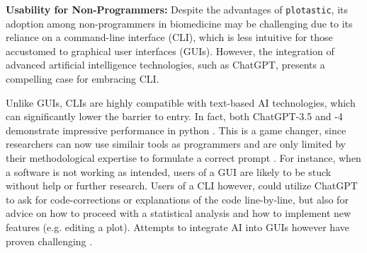 



\textbf{Usability for Non-Programmers:}
Despite the advantages of \texttt{plotastic}, its adoption among non-programmers
in biomedicine may be challenging due to its reliance on a command-line
interface (CLI), which is less intuitive for those accustomed to graphical user
interfaces (GUIs). However, the integration of advanced artificial intelligence
technologies, such as ChatGPT, presents a compelling case for embracing CLI.

Unlike GUIs, CLIs are highly compatible with text-based AI technologies, which
can significantly lower the barrier to entry. In fact, both ChatGPT-3.5 and -4
demonstrate impressive performance in python
\cite{arefinUnmaskingGiantComprehensive2023}. This is a game changer, since
researchers can now use similair tools as programmers and are only limited by
their methodological expertise to formulate a correct prompt
\cite{qureshiAreChatGPTLarge2023}. For instance, when a software is not
working as intended, users of a GUI are likely to be stuck without help or
further research. Users of a CLI however, could utilize ChatGPT to ask for
code-corrections or explanations of the code line-by-line, but also for advice
on how to proceed with a statistical analysis and how to implement new features
(e.g. editing a plot). Attempts to integrate AI into GUIs however have proven
challenging \cite{gaoASSISTGUITaskOrientedDesktop2024}. 

